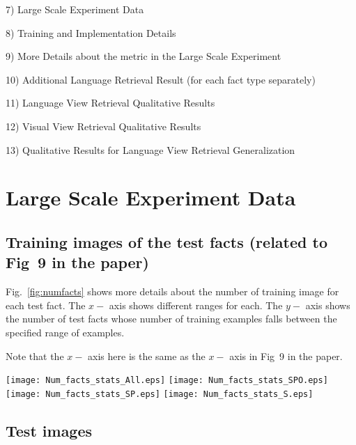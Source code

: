 \documentclass[runningheads]{llncs}
\begin{document}
7) Large Scale Experiment Data


8) Training and Implementation Details



9) More Details about the metric in the Large Scale Experiment


10) Additional Language Retrieval Result (for each fact type separately)

11) Language View Retrieval Qualitative Results


12) Visual View Retrieval Qualitative Results

13) Qualitative Results for Language View Retrieval Generalization

\section{Large Scale Experiment Data}
\label{app:lsc_data}


\subsection{Training images of the test facts (related to Fig~9 in the paper)}

Fig.~\ref{fig:numfacts} shows more details about the number of training image for each test fact. The $x-$ axis shows different ranges for each. The $y-$ axis shows the number of test facts whose number of training examples falls between the specified range of examples. 

Note that the $x-$ axis here is the same as the $x-$ axis in Fig~9 in the paper.




\begin{figure*}[b!]
             \vspace{-3mm}
  \texttt{[image: Num\_facts\_stats\_All.eps]} 
        \texttt{[image: Num\_facts\_stats\_SPO.eps]}
       \texttt{[image: Num\_facts\_stats\_SP.eps]}
             \texttt{[image: Num\_facts\_stats\_S.eps]}
             \vspace{-3mm}
        \caption{Number of Facts per each ``Number of Images Range''. $x-$axis shows ranges of number of images per fact. $y-$ axis is the number of facts whose number of images fall in the corresponding Range}
        \label{fig:numfacts}
\end{figure*}




\clearpage
\subsection{Test images}
\end{document}
